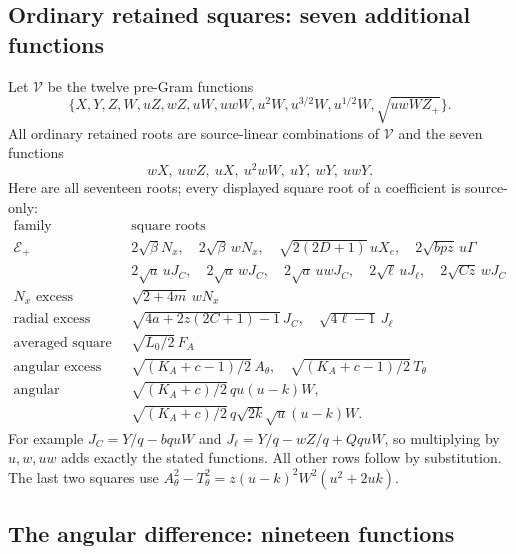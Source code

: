 \subsection{Ordinary retained squares: seven additional functions}

Let $\mathcal V$ be the twelve pre-Gram functions
\[
 \{X,Y,Z,W,uZ,wZ,uW,uwW,u^2W,
                     u^{3/2}W,u^{1/2}W,\sqrt{uwWZ_+}\}.
\]
All ordinary retained roots are source-linear combinations of
$\mathcal V$ and the seven functions
\[
                   wX,\ uwZ,\ uX,\ u^2wW,\ uY,\ wY,\ uwY.
\]
Here are all seventeen roots; every displayed square root of a
coefficient is source-only:
\[
\begin{array}{c|l}
\text{family}&\text{square roots}\\\hline
\mathcal E_+&2\sqrt\beta N_x,\quad2\sqrt\beta\,wN_x,\quad
 \sqrt{2(2D+1)}\,uX_e,\quad2\sqrt{bpz}\,u\Gamma\\
 &2\sqrt a\,uJ_C,\quad2\sqrt a\,wJ_C,\quad2\sqrt a\,uwJ_C,\quad
 2\sqrt\ell\,uJ_\ell,\quad2\sqrt{Cz}\,wJ_C\\
N_x\text{ excess}&\sqrt{2+4m}\,wN_x\\
\text{radial excess}&\sqrt{4a+2z(2C+1)-1}\,J_C,\quad
                              \sqrt{4\ell-1}\,J_\ell\\
\text{averaged square}&\sqrt{L_0/2}\,F_A\\
\text{angular excess}&\sqrt{(K_A+c-1)/2}\,A_\theta,\quad
                       \sqrt{(K_A+c-1)/2}\,T_\theta\\
\text{angular difference}&\sqrt{(K_A+c)/2}\,qu(u-k)W,\\
 &\sqrt{(K_A+c)/2}\,q\sqrt{2k}\sqrt u(u-k)W.
\end{array}
\]
For example $J_C=Y/q-bquW$ and
$J_\ell=Y/q-wZ/q+QquW$, so multiplying by $u,w,uw$ adds
exactly the stated functions. All other rows follow by substitution.
The last two squares use
$A_\theta^2-T_\theta^2=z(u-k)^2W^2(u^2+2uk)$.

\subsection{The angular difference: nineteen functions}

